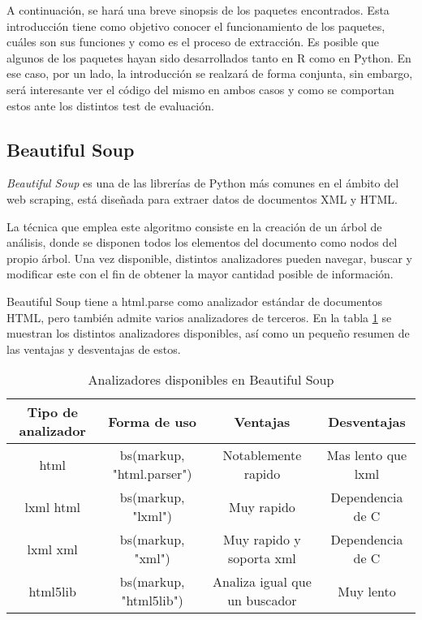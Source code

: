A continuación, se hará una breve sinopsis de los paquetes encontrados. Esta introducción tiene como
objetivo conocer el funcionamiento de los paquetes, cuáles son sus funciones y como es el proceso de
extracción. Es posible que algunos de los paquetes hayan sido desarrollados tanto en R como en Python. En 
ese caso, por un lado, la introducción se realzará de forma conjunta, sin embargo, será interesante ver 
el código del mismo en ambos casos y como se comportan estos ante los distintos test de evaluación.

\subsection{Beautiful Soup}
\label{subsec:beautiful soup}

\emph{Beautiful Soup} \cite{beautifulsoup} es una de las librerías de Python más comunes en el ámbito del
web scraping, está diseñada para extraer datos de documentos XML y HTML.

La técnica que emplea este algoritmo consiste en la creación de un árbol de análisis, donde se disponen
todos los elementos del documento como nodos del propio árbol. Una vez disponible, distintos analizadores 
pueden navegar, buscar y modificar este con el fin de obtener la mayor cantidad posible de información.

Beautiful Soup tiene a html.parse como analizador estándar de documentos HTML, pero también admite varios
analizadores de terceros. En la tabla \ref{tab:analizadores disponibles en beautiful soup} se muestran los 
distintos analizadores disponibles, así como un pequeño resumen de las ventajas y desventajas de estos.

\begin{table}[h]
  \begin{center}
  \begin{tabular}{| c | c | c | c |}
  \hline Tipo de analizador & Forma de uso & Ventajas & Desventajas \\ \hline
  html & bs(markup, "html.parser") & Notablemente rapido & Mas lento que lxml\\
  lxml html & 	bs(markup, "lxml") & Muy rapido & Dependencia de C\\
  lxml xml & bs(markup, "xml") & Muy rapido y soporta xml & Dependencia de C\\
  html5lib & bs(markup, "html5lib") & Analiza igual que un buscador & Muy lento\\ \hline
  \end{tabular}
  \caption{Analizadores disponibles en Beautiful Soup}
  \label{tab:analizadores disponibles en beautiful soup}
  \end{center}
\end{table}

